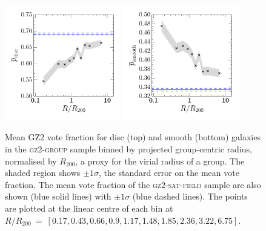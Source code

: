 \documentclass[useAMS,usenatbib]{mn2e}
\begin{document}
\begin{figure}
\includegraphics[width=0.45\textwidth]{p_disc_trend_with_log_radius_field_compare_rf_bins.pdf}
\includegraphics[width=0.45\textwidth]{p_smooth_trend_with_log_radius_field_compare_rf_bins.pdf}
\caption[Mean $p_d$ and $p_s$ with group radius in the \textsc{gz2-group} sample]{Mean GZ2 vote fraction for disc (top) and smooth (bottom) galaxies in the \textsc{gz2-group} sample binned by projected group-centric radius, normalised by $R_{200}$, a proxy for the virial radius of a group. The shaded region shows $\pm1\sigma$, the standard error on the mean vote fraction. The mean vote fraction of the \textsc{gz2-sat-field} sample are also shown (blue solid lines) with $\pm1\sigma$ (blue dashed lines). The points are plotted at the linear centre of each bin at $R/R_{200}~=~ [0.17,  0.43,  0.66,  0.9 ,  1.17,  1.48,  1.85,  2.36,  3.22,  6.75]$.}
\label{fig:morphradius}
\end{figure}
\end{document}
